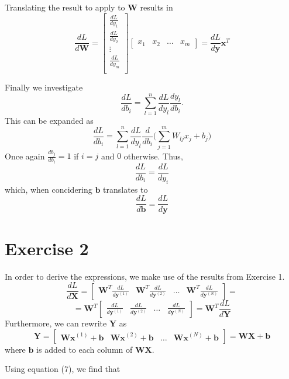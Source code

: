 \documentclass{article}
\begin{document}
Translating the result to apply to $\mathbf{W}$ results in
\begin{equation}
    \frac{d L}{d \mathbf{W}} = \begin{bmatrix}
    \frac{d L}{d y_1} \\
    \frac{d L}{d y_2} \\
    \vdots \\
    \frac{d L}{d y_m} \\
    \end{bmatrix}
    \begin{bmatrix}
    x_1 & x_2 & \hdots & x_m
    \end{bmatrix}
    = \frac{d L}{d \mathbf{y}} \mathbf{x}^T
\end{equation}

Finally we investigate
\begin{equation}
    \frac{d L}{d b_i} = \sum_{l = 1}^n \frac{d L}{d y_l} \frac{d y_l}{d b_i}.
\end{equation}
This can be expanded as
\begin{equation}
    \frac{d L}{d b_i} = \sum_{l = 1}^n \frac{d L}{d y_l} \frac{d}{d b_i} \bigg( \sum_{j = 1}^m W_{l j} x_j + b_j \bigg)
\end{equation}
Once again $\frac{d b_j}{d b_i} = 1$ if $i = j$ and $0$ otherwise. Thus,
\begin{equation}
    \frac{d L}{d b_i} = \frac{d L}{d y_i}
\end{equation}
which, when concidering $\mathbf{b}$ translates to
\begin{equation}
    \frac{d L}{d \mathbf{b}} = \frac{d L}{d \mathbf{y}}
\end{equation}

\section{Exercise 2}
In order to derive the expressions, we make use of the results from Exercise 1.
\begin{equation}
    \frac{d L}{d \mathbf{X}} = 
\begin{bmatrix}
 \mathbf{W}^T \frac{d L}{d \mathbf{y}^(1)} &
 \mathbf{W}^T \frac{d L}{d \mathbf{y}^(2)} &
 \hdots &
 \mathbf{W}^T \frac{d L}{d \mathbf{y}^(N)}
\end{bmatrix}
= 
\end{equation}
\begin{equation}
= \mathbf{W}^T
\begin{bmatrix}
    \frac{d L}{d \mathbf{y}^(1)} &
    \frac{d L}{d \mathbf{y}^(2)} &
    \hdots &
    \frac{d L}{d \mathbf{y}^(N)}
\end{bmatrix}
= \mathbf{W}^T \frac{d L}{d \mathbf{Y}}
\end{equation}
Furthermore, we can rewrite $\mathbf{Y}$ as
\begin{equation}
    \mathbf{Y} = \begin{bmatrix}
        \mathbf{W x}^(1) + \mathbf{b} &
        \mathbf{W x}^(2) + \mathbf{b} &
        \hdots &
        \mathbf{W x}^(N) + \mathbf{b}
    \end{bmatrix}
    =
\mathbf{W X + b}
\end{equation}
where $\mathbf{b}$ is added to each column of $\mathbf{W X}$.

Using equation (7), we find that
\end{document}
